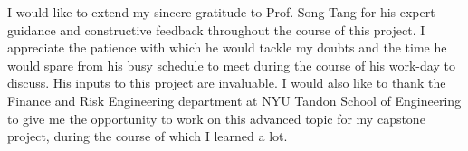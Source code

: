 
I would like to extend my sincere gratitude to Prof. Song Tang for his expert guidance and constructive
feedback throughout the course of this project. I appreciate the patience with which he would tackle my
doubts and the time he would spare from his busy schedule to meet during the course of his work-day
to discuss. His inputs to this project are invaluable. I would also like to thank the Finance and Risk
Engineering department at NYU Tandon School of Engineering to give me the opportunity to work on this advanced topic for my
capstone project, during the course of which I learned a lot.

\noindent
{}
\makebox[\textwidth]{\hfill\makebox[3in]{\hfill\graddate\hfill}}

